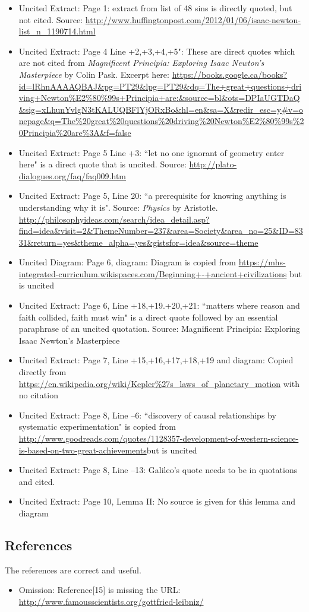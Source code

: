 \documentclass[11pt]{article}
\begin{document}
\begin{itemize}
\item Uncited Extract: Page 1: extract from list of 48 sins is directly quoted, but not cited. Source: \url{http://www.huffingtonpost.com/2012/01/06/isaac-newton-list_n_1190714.html}
\item Uncited Extract: Page 4 Line +2,+3,+4,+5": These are direct quotes which are not cited from \textit{Magnificent Principia: Exploring Isaac Newton's Masterpiece} by Colin Pask. Excerpt here: \url{https://books.google.ca/books?id=lRhnAAAAQBAJ&pg=PT29&lpg=PT29&dq=The+great+questions+driving+Newton\%E2\%80\%99s+Principia+are:\&source=bl&ots=DPIaUGTDaQ&sig=xLhunYvlgN3tKALUQBFlYjORxBo&hl=en&sa=X&redir_esc=y#v=onepage&q=The\%20great\%20questions\%20driving\%20Newton\%E2\%80\%99s\%20Principia\%20are\%3A&f=false}
\item Uncited Extract: Page 5 Line +3: ``let no one ignorant of geometry enter here" is a direct quote that is uncited. Source: \url{http://plato-dialogues.org/faq/faq009.htm}
\item Uncited Extract: Page 5, Line 20: ``a prerequisite for knowing anything is understanding why it is". Source: \textit{Physics} by Aristotle. \url{http://philosophyideas.com/search/idea_detail.asp?find=idea&visit=2&ThemeNumber=237&area=Society&area_no=25&ID=8331&return=yes&theme_alpha=yes&gistsfor=idea&source=theme}
\item Uncited Diagram: Page 6, diagram: Diagram is copied from \url{https://mhs-integrated-curriculum.wikispaces.com/Beginning+-+ancient+civilizations} but is uncited
\item Uncited Extract: Page 6, Line +18,+19.+20,+21: ``matters where reason and faith collided, faith must win" is a direct quote followed by an essential paraphrase of an uncited quotation. Source: Magnificent Principia: Exploring Isaac Newton's Masterpiece
\item Uncited Extract: Page 7, Line +15,+16,+17,+18,+19 and diagram: Copied directly from \url{https://en.wikipedia.org/wiki/Kepler\%27s_laws_of_planetary_motion} with no citation
\item Uncited Extract: Page 8, Line --6: ``discovery of causal relationships by systematic experimentation" is copied from \url{http://www.goodreads.com/quotes/1128357-development-of-western-science-is-based-on-two-great-achievements}but is uncited
\item Uncited Extract: Page 8, Line --13: Galileo's quote needs to be in quotations and cited. 
\item Uncited Extract: Page 10, Lemma II: No source is given for this lemma and diagram
\end{itemize}

\subsection*{References}

The references are correct and useful.

\begin{itemize}
\item Omission: Reference[15] is missing the URL: \url{http://www.famousscientists.org/gottfried-leibniz/}
\end{itemize}
\end{document}
